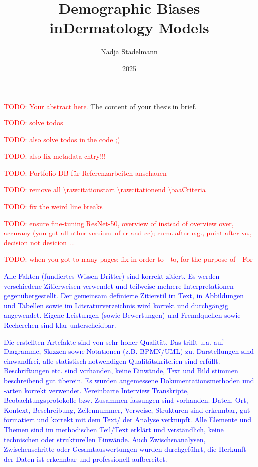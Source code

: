 \documentclass[12pt, a4paper, oneside]{book}   	%
\author{Nadja Stadelmann}                       %
\title{Demographic Biases in\linebreak Dermatology Models}   %
\subtitle{\large \todo{subtitle}}               %
\date{2025}                                     %
\renewcommand{\todo}[1]{\textcolor{red}{TODO: #1}}
\newcommand{\baaCriteria}[1]{\textcolor{blue}{#1}}
\begin{document}
	\english                                        %
	\maketitle
	
	
	\begin{abstractstyle}{\hsummary}
		\todo{Your abstract here.}
	    The content of your thesis in brief.
	\end{abstractstyle}
	
	\tableofcontents
	
	\listoftodos
	\todo{solve todos} 
	
	
	\todo{also solve todos in the code ;)} 
	
	
	\todo{also fix metadata entry!!!} 
	
	
	\todo{Portfolio DB für Referenzarbeiten anschauen}
	
	\todo{remove all \textbackslash rawcitationstart \textbackslash rawcitationend  \textbackslash baaCriteria}
	
	\todo{fix the weird line breaks}
	
	\todo{ensure fine-tuning ResNet-50, overview of instead of overview over, accuracy (you got all other versions of rr and cc); coma after e.g., point after vs., decision not desicion ...}
	
	\todo{when you got to many pages: fix in order to - to, for the purpose of - For}
	
	
	\baaCriteria{Alle Fakten (fundiertes Wissen Dritter) sind korrekt zitiert. Es werden verschiedene Zitierweisen verwendet und teilweise mehrere Interpretationen gegenübergestellt. Der gemeinsam definierte Zitierstil im Text, in Abbildungen und Tabellen sowie im Literaturverzeichnis wird korrekt und durchgängig angewendet. Eigene Leistungen (sowie Bewertungen) und Fremdquellen sowie Recherchen sind klar unterscheidbar.} 
	
	
	\baaCriteria{Die erstellten Artefakte sind von sehr hoher Qualität. Das trifft u.a. auf Diagramme, Skizzen sowie Notationen (z.B. BPMN/UML) zu. Darstellungen sind einwandfrei, alle statistisch notwendigen Qualitätskriterien sind erfüllt. Beschriftungen etc. sind vorhanden, keine Einwände, Text und Bild stimmen beschreibend gut überein. Es wurden angemessene Dokumentationsmethoden und -arten korrekt verwendet. Vereinbarte Interview Transkripte, Beobachtungsprotokolle bzw. Zusammen-fassungen sind vorhanden. Daten, Ort, Kontext, Beschreibung, Zeilennummer, Verweise, Strukturen sind erkennbar, gut formatiert und korrekt mit dem Text/ der Analyse verknüpft. Alle Elemente und Themen sind im methodischen Teil/Text erklärt und verständlich, keine technischen oder strukturellen Einwände. Auch Zwischenanalysen, Zwischenschritte oder Gesamtauswertungen wurden durchgeführt, die Herkunft der Daten ist erkennbar und professionell aufbereitet.} 
	
\end{document}
